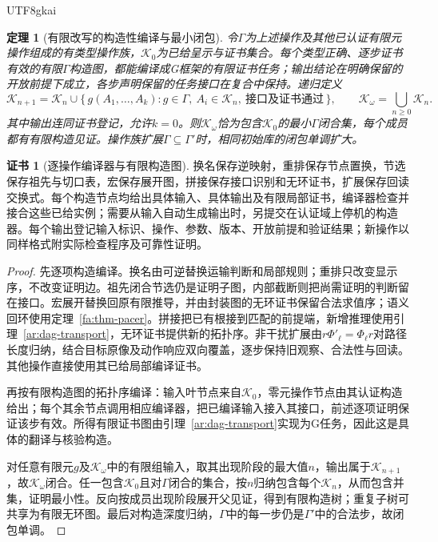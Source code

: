 \documentclass[11pt,a4paper]{article}
\theoremstyle{plain}
\newtheorem{theorem}{定理}[section]
\theoremstyle{definition}
\newtheorem*{certificate}{证书}
\theoremstyle{remark}
\begin{document}
\begin{CJK*}{UTF8}{gkai}
\begin{theorem}[有限改写的构造性编译与最小闭包]
\label{ar:finite-closure}
令$\Gamma$为上述操作及其他已认证有限元操作组成的有类型操作族，$\mathcal K_0$为已给呈示与证书集合。每个类型正确、逐步证书有效的有限$\Gamma$构造图，都能编译成G框架的有限证书任务；输出结论在明确保留的开放前提下成立，各步声明保留的任务接口在复合中保持。递归定义
\[
 \mathcal K_{n+1}
 =\mathcal K_n\cup
 \{\,g(A_1,\ldots,A_k):
       g\in\Gamma,\ A_i\in\mathcal K_n,\
       \text{接口及证书通过}\,\},
 \qquad
 \mathcal K_\omega=\bigcup_{n\ge0}\mathcal K_n.
\]
其中输出连同证书登记，允许$k=0$。则$\mathcal K_\omega$恰为包含$\mathcal K_0$的最小$\Gamma$闭合集，每个成员都有有限构造见证。操作族扩展$\Gamma\subseteq\Gamma'$时，相同初始库的闭包单调扩大。
\end{theorem}
\begin{certificate}[逐操作编译器与有限构造图]
换名保存逆映射，重排保存节点置换，节选保存祖先与切口表，宏保存展开图，拼接保存接口识别和无环证书，扩展保存回读交换式。每个构造节点均给出具体输入、具体输出及有限局部证书，编译器检查并接合这些已给实例；需要从输入自动生成输出时，另提交在认证域上停机的构造器。每个输出登记输入标识、操作、参数、版本、开放前提和验证结果；新操作以同样格式附实际检查程序及可靠性证明。
\end{certificate}
\begin{proof}
先逐项构造编译。换名由可逆替换运输判断和局部规则；重排只改变显示序，不改变证明边。祖先闭合节选仍是证明子图，内部截断则把尚需证明的判断留在接口。宏展开替换回原有限推导，并由封装图的无环证书保留合法求值序；语义回环使用定理~\ref{fa:thm-pacer}。拼接把已有根接到匹配的前提端，新增推理使用引理~\ref{ar:dag-transport}，无环证书提供新的拓扑序。非干扰扩展由$r\Phi'_\ell=\Phi_\ell r$对路径长度归纳，结合目标原像及动作响应双向覆盖，逐步保持旧观察、合法性与回读。其他操作直接使用其已给局部编译证书。

再按有限构造图的拓扑序编译：输入叶节点来自$\mathcal K_0$，零元操作节点由其认证构造给出；每个其余节点调用相应编译器，把已编译输入接入其接口，前述逐项证明保证该步有效。所得有限证书图由引理~\ref{ar:dag-transport}实现为G任务，因此这是具体的翻译与核验构造。

对任意有限元$g$及$\mathcal K_\omega$中的有限组输入，取其出现阶段的最大值$n$，输出属于$\mathcal K_{n+1}$，故$\mathcal K_\omega$闭合。任一包含$\mathcal K_0$且对$\Gamma$闭合的集合，按$n$归纳包含每个$\mathcal K_n$，从而包含并集，证明最小性。反向按成员出现阶段展开父见证，得到有限构造树；重复子树可共享为有限无环图。最后对构造深度归纳，$\Gamma$中的每一步仍是$\Gamma'$中的合法步，故闭包单调。
\end{proof}


\end{CJK*}
\end{document}
